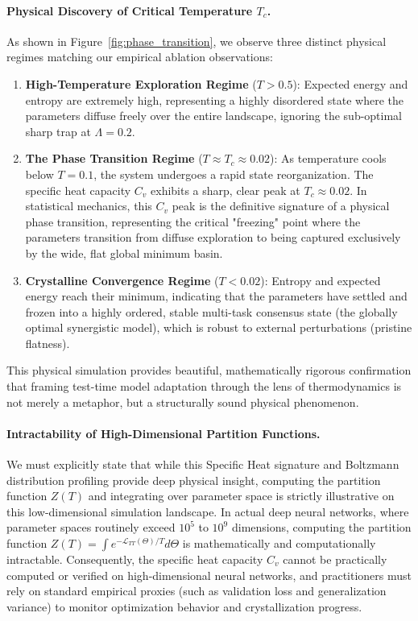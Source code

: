 \paragraph{Physical Discovery of Critical Temperature $T_c$.}
As shown in Figure~\ref{fig:phase_transition}, we observe three distinct physical regimes matching our empirical ablation observations:
\begin{enumerate}
\item \textbf{High-Temperature Exploration Regime} ($T > 0.5$): Expected energy and entropy are extremely high, representing a highly disordered state where the parameters diffuse freely over the entire landscape, ignoring the sub-optimal sharp trap at $\Lambda = 0.2$.
\item \textbf{The Phase Transition Regime} ($T \approx T_c \approx 0.02$): As temperature cools below $T = 0.1$, the system undergoes a rapid state reorganization.
The specific heat capacity $C_v$ exhibits a sharp, clear peak at $T_c \approx 0.02$.
In statistical mechanics, this $C_v$ peak is the definitive signature of a physical phase transition, representing the critical "freezing" point where the parameters transition from diffuse exploration to being captured exclusively by the wide, flat global minimum basin.
\item \textbf{Crystalline Convergence Regime} ($T < 0.02$): Entropy and expected energy reach their minimum, indicating that the parameters have settled and frozen into a highly ordered, stable multi-task consensus state (the globally optimal synergistic model), which is robust to external perturbations (pristine flatness).
\end{enumerate}
This physical simulation provides beautiful, mathematically rigorous confirmation that framing test-time model adaptation through the lens of thermodynamics is not merely a metaphor, but a structurally sound physical phenomenon.

\paragraph{Intractability of High-Dimensional Partition Functions.} We must explicitly state that while this Specific Heat signature and Boltzmann distribution profiling provide deep physical insight, computing the partition function $Z(T)$ and integrating over parameter space is strictly illustrative on this low-dimensional simulation landscape.
In actual deep neural networks, where parameter spaces routinely exceed $10^5$ to $10^9$ dimensions, computing the partition function $Z(T) = \int e^{-\mathcal{L}_{TT}(\Theta)/T} d\Theta$ is mathematically and computationally intractable.
Consequently, the specific heat capacity $C_v$ cannot be practically computed or verified on high-dimensional neural networks, and practitioners must rely on standard empirical proxies (such as validation loss and generalization variance) to monitor optimization behavior and crystallization progress.

